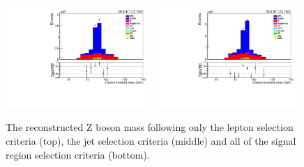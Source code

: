 \begin{figure}[ht]
\includegraphics[width=0.49\textwidth]{figs/background-estimation/plots/unblinded/prompt_ee_ttbarInc/zPairMass_NPL_ee_wMass_ee.pdf}
\includegraphics[width=0.49\textwidth]{figs/background-estimation/plots/unblinded/prompt_mumu_ttbarInc/zPairMass_NPL_mumu_wMass_mumu.pdf}
\caption{
The reconstructed Z boson mass following only the lepton selection criteria (top), the jet selection criteria (middle) and all of the signal region selection criteria (bottom).
}
\label{fig:App_SR_zBosonMass}
\end{figure}

